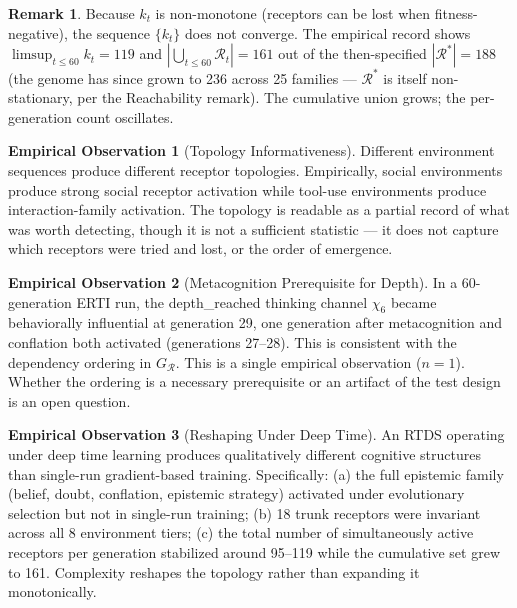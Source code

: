 \documentclass[12pt]{article}
\theoremstyle{definition}
\newtheorem{remark}{Remark}
\newtheorem{observation}{Empirical Observation}
\begin{document}
\begin{remark}
Because $k_t$ is non-monotone (receptors can be lost when fitness-negative), the
sequence $\{k_t\}$ does not converge. The empirical record shows
$\limsup_{t \leq 60} k_t = 119$ and
$|\bigcup_{t \leq 60} \mathcal{R}_t| = 161$ out of the then-specified
$|\mathcal{R}^*| = 188$ (the genome has since grown to 236 across 25 families ---
$\mathcal{R}^*$ is itself non-stationary, per the Reachability remark).
The cumulative union grows; the per-generation count oscillates.
\end{remark}

\begin{observation}[Topology Informativeness]
Different environment sequences produce different receptor topologies. Empirically,
social environments produce strong social receptor activation while tool-use
environments produce interaction-family activation. The topology is readable as a
partial record of what was worth detecting, though it is not a sufficient statistic
--- it does not capture which receptors were tried and lost, or the order of emergence.
\end{observation}

\begin{observation}[Metacognition Prerequisite for Depth]
In a 60-generation ERTI run, the depth\_reached thinking channel $\chi_6$ became
behaviorally influential at generation 29, one generation after metacognition and
conflation both activated (generations 27--28). This is consistent with the dependency
ordering in $G_\mathcal{R}$. This is a single empirical observation ($n=1$).
Whether the ordering is a necessary prerequisite or an artifact of the test design
is an open question.
\end{observation}

\begin{observation}[Reshaping Under Deep Time]
An RTDS operating under deep time learning produces qualitatively different cognitive
structures than single-run gradient-based training. Specifically: (a) the full
epistemic family (belief, doubt, conflation, epistemic strategy) activated under
evolutionary selection but not in single-run training; (b) 18 trunk receptors were
invariant across all 8 environment tiers; (c) the total number of simultaneously
active receptors per generation stabilized around 95--119 while the cumulative set
grew to 161. Complexity reshapes the topology rather than expanding it monotonically.
\end{observation}
\end{document}
